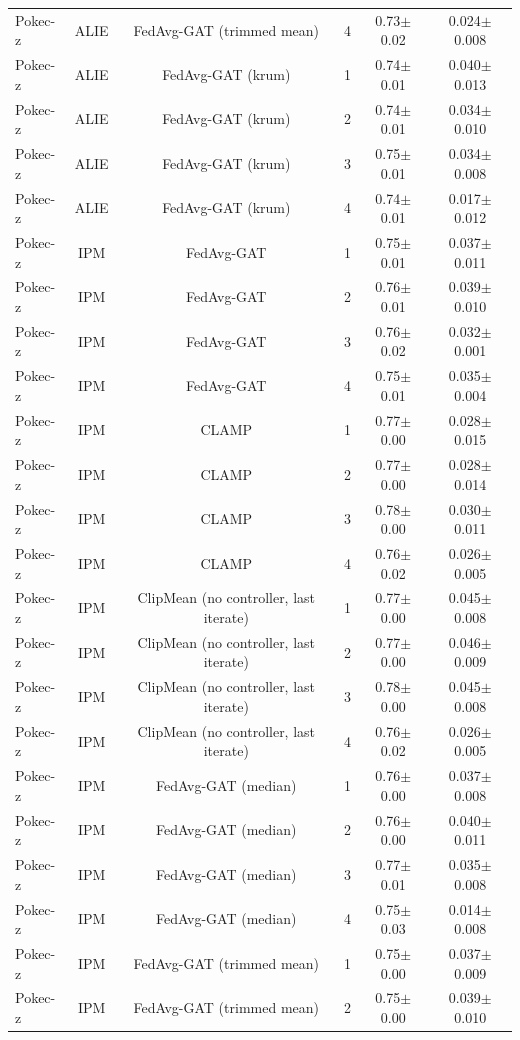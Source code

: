 \begin{table}[tbp]
\begin{tabular}{lccccc}
Pokec-z & ALIE & FedAvg-GAT (trimmed mean) & 4 & 0.73$\pm$0.02 & 0.024$\pm$0.008 \\
Pokec-z & ALIE & FedAvg-GAT (krum) & 1 & 0.74$\pm$0.01 & 0.040$\pm$0.013 \\
Pokec-z & ALIE & FedAvg-GAT (krum) & 2 & 0.74$\pm$0.01 & 0.034$\pm$0.010 \\
Pokec-z & ALIE & FedAvg-GAT (krum) & 3 & 0.75$\pm$0.01 & 0.034$\pm$0.008 \\
Pokec-z & ALIE & FedAvg-GAT (krum) & 4 & 0.74$\pm$0.01 & 0.017$\pm$0.012 \\
Pokec-z & IPM & FedAvg-GAT & 1 & 0.75$\pm$0.01 & 0.037$\pm$0.011 \\
Pokec-z & IPM & FedAvg-GAT & 2 & 0.76$\pm$0.01 & 0.039$\pm$0.010 \\
Pokec-z & IPM & FedAvg-GAT & 3 & 0.76$\pm$0.02 & 0.032$\pm$0.001 \\
Pokec-z & IPM & FedAvg-GAT & 4 & 0.75$\pm$0.01 & 0.035$\pm$0.004 \\
Pokec-z & IPM & CLAMP & 1 & 0.77$\pm$0.00 & 0.028$\pm$0.015 \\
Pokec-z & IPM & CLAMP & 2 & 0.77$\pm$0.00 & 0.028$\pm$0.014 \\
Pokec-z & IPM & CLAMP & 3 & 0.78$\pm$0.00 & 0.030$\pm$0.011 \\
Pokec-z & IPM & CLAMP & 4 & 0.76$\pm$0.02 & 0.026$\pm$0.005 \\
Pokec-z & IPM & ClipMean (no controller, last iterate) & 1 & 0.77$\pm$0.00 & 0.045$\pm$0.008 \\
Pokec-z & IPM & ClipMean (no controller, last iterate) & 2 & 0.77$\pm$0.00 & 0.046$\pm$0.009 \\
Pokec-z & IPM & ClipMean (no controller, last iterate) & 3 & 0.78$\pm$0.00 & 0.045$\pm$0.008 \\
Pokec-z & IPM & ClipMean (no controller, last iterate) & 4 & 0.76$\pm$0.02 & 0.026$\pm$0.005 \\
Pokec-z & IPM & FedAvg-GAT (median) & 1 & 0.76$\pm$0.00 & 0.037$\pm$0.008 \\
Pokec-z & IPM & FedAvg-GAT (median) & 2 & 0.76$\pm$0.00 & 0.040$\pm$0.011 \\
Pokec-z & IPM & FedAvg-GAT (median) & 3 & 0.77$\pm$0.01 & 0.035$\pm$0.008 \\
Pokec-z & IPM & FedAvg-GAT (median) & 4 & 0.75$\pm$0.03 & 0.014$\pm$0.008 \\
Pokec-z & IPM & FedAvg-GAT (trimmed mean) & 1 & 0.75$\pm$0.00 & 0.037$\pm$0.009 \\
Pokec-z & IPM & FedAvg-GAT (trimmed mean) & 2 & 0.75$\pm$0.00 & 0.039$\pm$0.010 \\

\end{tabular}
\end{table}
